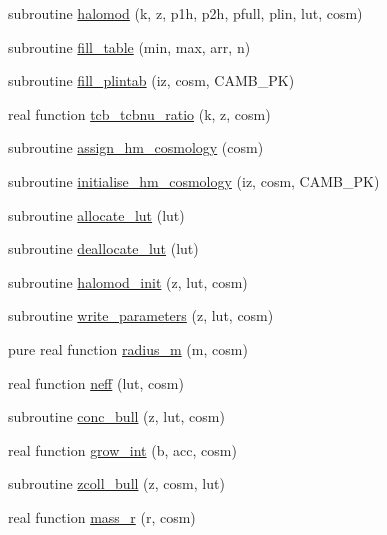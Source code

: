 \begin{DoxyCompactItemize}
subroutine \mbox{\hyperlink{namespacenonlinear_a8b11cb79c822afc15ee5506a6b79e786}{halomod}} (k, z, p1h, p2h, pfull, plin, lut, cosm)
\item 
subroutine \mbox{\hyperlink{namespacenonlinear_a6ac027990c6d758a7c5420da7001dfc7}{fill\+\_\+table}} (min, max, arr, n)
\item 
subroutine \mbox{\hyperlink{namespacenonlinear_af44943bd607e88cf910383917ce03826}{fill\+\_\+plintab}} (iz, cosm, C\+A\+M\+B\+\_\+\+PK)
\item 
real function \mbox{\hyperlink{namespacenonlinear_a71f404d2d1de4ad126d2e43eea191621}{tcb\+\_\+tcbnu\+\_\+ratio}} (k, z, cosm)
\item 
subroutine \mbox{\hyperlink{namespacenonlinear_a44e107b52cde4df598539a1ed12f252a}{assign\+\_\+hm\+\_\+cosmology}} (cosm)
\item 
subroutine \mbox{\hyperlink{namespacenonlinear_a819e3b1efc1572f5e75eb5f2b415b4b4}{initialise\+\_\+hm\+\_\+cosmology}} (iz, cosm, C\+A\+M\+B\+\_\+\+PK)
\item 
subroutine \mbox{\hyperlink{namespacenonlinear_ac9ae18bd4ed466f0f8287e5c4757bec9}{allocate\+\_\+lut}} (lut)
\item 
subroutine \mbox{\hyperlink{namespacenonlinear_a9a42cb3acfe84c2c6ea9f085b357bdd1}{deallocate\+\_\+lut}} (lut)
\item 
subroutine \mbox{\hyperlink{namespacenonlinear_af025b4b6e2a711cea66352e50ea6de97}{halomod\+\_\+init}} (z, lut, cosm)
\item 
subroutine \mbox{\hyperlink{namespacenonlinear_abd2adda1e3c0e77617e1142893c4aa71}{write\+\_\+parameters}} (z, lut, cosm)
\item 
pure real function \mbox{\hyperlink{namespacenonlinear_af71d6d6d99de458db1a669744d7b1088}{radius\+\_\+m}} (m, cosm)
\item 
real function \mbox{\hyperlink{namespacenonlinear_a94503cd59bd5a206379a0c13afe89ffc}{neff}} (lut, cosm)
\item 
subroutine \mbox{\hyperlink{namespacenonlinear_a9559196d503174393cf74ce857984216}{conc\+\_\+bull}} (z, lut, cosm)
\item 
real function \mbox{\hyperlink{namespacenonlinear_a2ccd15402588e67b26abc93ccf910de6}{grow\+\_\+int}} (b, acc, cosm)
\item 
subroutine \mbox{\hyperlink{namespacenonlinear_a53b6da6e807b30b0078e77b9900c33b6}{zcoll\+\_\+bull}} (z, cosm, lut)
\item 
real function \mbox{\hyperlink{namespacenonlinear_a164bc94a32486b7a39cab9d1d3ddbafb}{mass\+\_\+r}} (r, cosm)

\end{DoxyCompactItemize}
